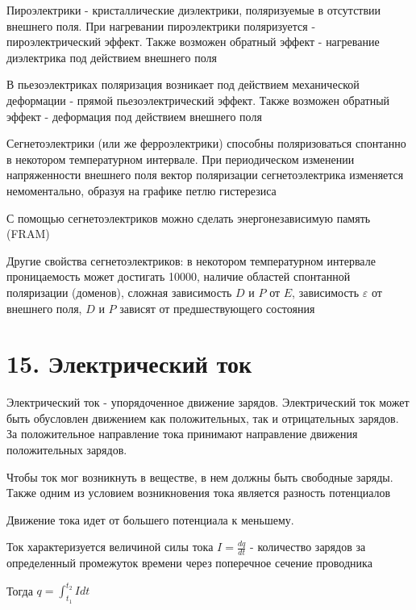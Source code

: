 \documentclass[12pt]{article}
\begin{document}
Пироэлектрики - кристаллические диэлектрики, поляризуемые в отсутствии внешнего поля. При нагревании пироэлектрики поляризуется - пироэлектрический эффект.
Также возможен обратный эффект - нагревание диэлектрика под действием внешнего поля

\mediumvspace

В пьезоэлектриках поляризация возникает под действием механической деформации - прямой пьезоэлектрический эффект. Также 
возможен обратный эффект - деформация под действием внешнего поля

\mediumvspace

Сегнетоэлектрики (или же ферроэлектрики) способны поляризоваться спонтанно в некотором температурном интервале. 
При периодическом изменении напряженности внешнего поля вектор поляризации сегнетоэлектрика изменяется немоментально, 
образуя на графике петлю гистерезиса

С помощью сегнетоэлектриков можно сделать энергонезависимую память (FRAM)

Другие свойства сегнетоэлектриков: в некотором температурном интервале проницаемость может достигать 10000, наличие областей спонтанной поляризации (доменов), 
сложная зависимость $D$ и $P$ от $E$, зависимость $\varepsilon$ от внешнего поля, $D$ и $P$ зависят от предшествующего состояния






\section{15. Электрический ток}

\Def Электрический ток - упорядоченное движение зарядов. Электрический ток может быть обусловлен движением как положительных, так и отрицательных зарядов.
За положительное направление тока принимают направление движения положительных зарядов.

Чтобы ток мог возникнуть в веществе, в нем должны быть свободные заряды. Также одним из условием возникновения тока является разность потенциалов

Движение тока идет от большего потенциала к меньшему.

Ток характеризуется величиной силы тока $I = \frac{dq}{dt}$ - количество зарядов за определенный промежуток времени через поперечное сечение проводника

Тогда $q = \int_{t_1}^{t_2} Idt$
\end{document}
